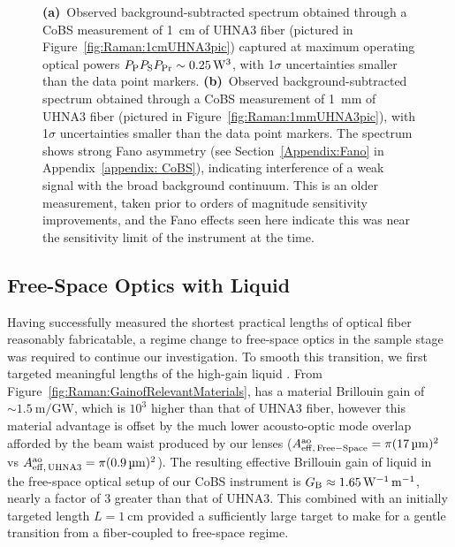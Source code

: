 \begin{figure}[h!]
\begin{subfigure}[b]{0.49\textwidth}
    \caption{}
    \label{fig:Raman:1mmUHNA3}
  \end{subfigure}
  \caption[\ac{CoBS} measurements of \SI{1}{\centi\meter} and \SI{1}{\milli\meter} \ac{UHNA3} fiber, in pursuit of observing Brillouin-induced Raman modes.]{\textbf{(a)}~Observed background-subtracted spectrum obtained through a \ac{CoBS} measurement of \SI{1}{\centi\meter} of \ac{UHNA3} fiber (pictured in Figure~\ref{fig:Raman:1cmUHNA3pic}) captured at maximum operating optical powers \(P_{\rm P}P_{\rm S}P_{\rm Pr} \sim \SI{0.25}{\cubic\watt}\), with 1\(\sigma\) uncertainties smaller than the data point markers. \textbf{(b)}~Observed background-subtracted spectrum obtained through a \ac{CoBS} measurement of \SI{1}{\milli\meter} of \ac{UHNA3} fiber (pictured in Figure~\ref{fig:Raman:1mmUHNA3pic}), with 1\(\sigma\) uncertainties smaller than the data point markers. The spectrum shows strong Fano asymmetry (see Section~\ref{Appendix:Fano} in Appendix~\ref{appendix: CoBS}), indicating interference of a weak signal with the broad background continuum. This is an older measurement, taken prior to orders of magnitude sensitivity improvements, and the Fano effects seen here indicate this was near the sensitivity limit of the instrument at the time.}
  \label{fig:Raman:UHNA3}
\end{figure}

\subsection{Free-Space Optics with Liquid \texorpdfstring{}{CS2}}
\label{subsec:Raman:Target:CS2Vial}

Having successfully measured the shortest practical lengths of optical fiber reasonably fabricatable, a regime change to free-space optics in the sample stage was required to continue our investigation. To smooth this transition, we first targeted meaningful lengths of the high-gain liquid . From Figure~\ref{fig:Raman:GainofRelevantMaterials},  has a material Brillouin gain of \(\sim\SI{1.5}{\meter\per\giga\watt}\), which is \(10^{3}\) higher than that of \ac{UHNA3} fiber, however this material advantage is offset by the much lower acousto-optic mode overlap afforded by the beam waist produced by our lenses (\(A_{\rm eff,\,Free-Space}^{\rm ao} = \pi(\SI{17}{\micro\meter})^{2}\) vs \(A_{\rm eff,\,UHNA3}^{\rm ao} = \pi(\SI{0.9}{\micro\meter})^{2}\)). The resulting effective Brillouin gain of liquid  in the free-space optical setup of our \ac{CoBS} instrument is \(G_{\rm B} \approx \SI{1.65}{\per\watt\per\meter}\), nearly a factor of 3 greater than that of \ac{UHNA3}. This combined with an initially targeted length \(L = \SI{1}{\centi\meter}\) provided a sufficiently large target to make for a gentle transition from a fiber-coupled to free-space regime.

